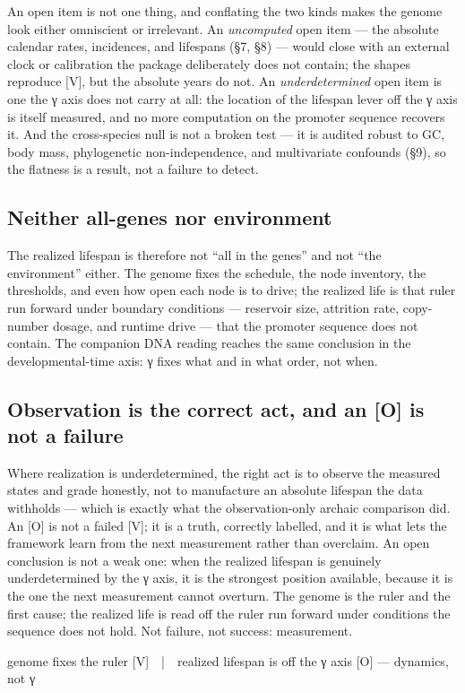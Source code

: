 \documentclass[11pt]{article}
\begin{document}
An open item is not one thing, and conflating the two kinds makes the genome look either omniscient or irrelevant. An \textit{uncomputed} open item — the absolute calendar rates, incidences, and lifespans (§7, §8) — would close with an external clock or calibration the package deliberately does not contain; the shapes reproduce [V], but the absolute years do not. An \textit{underdetermined} open item is one the γ axis does not carry at all: the location of the lifespan lever off the γ axis is itself measured, and no more computation on the promoter sequence recovers it. And the cross-species null is not a broken test — it is audited robust to GC, body mass, phylogenetic non-independence, and multivariate confounds (§9), so the flatness is a result, not a failure to detect.

\subsection*{Neither all-genes nor environment}

The realized lifespan is therefore not “all in the genes” and not “the environment” either. The genome fixes the schedule, the node inventory, the thresholds, and even how open each node is to drive; the realized life is that ruler run forward under boundary conditions — reservoir size, attrition rate, copy-number dosage, and runtime drive — that the promoter sequence does not contain. The companion DNA reading reaches the same conclusion in the developmental-time axis: γ fixes what and in what order, not when.

\subsection*{Observation is the correct act, and an [O] is not a failure}

Where realization is underdetermined, the right act is to observe the measured states and grade honestly, not to manufacture an absolute lifespan the data withholds — which is exactly what the observation-only archaic comparison did. An [O] is not a failed [V]; it is a truth, correctly labelled, and it is what lets the framework learn from the next measurement rather than overclaim. An open conclusion is not a weak one: when the realized lifespan is genuinely underdetermined by the γ axis, it is the strongest position available, because it is the one the next measurement cannot overturn. The genome is the ruler and the first cause; the realized life is read off the ruler run forward under conditions the sequence does not hold. Not failure, not success: measurement.

\begin{center}\ttfamily\small genome fixes the ruler [V]  |  realized lifespan is off the γ axis [O] — dynamics, not γ\end{center}
\end{document}
